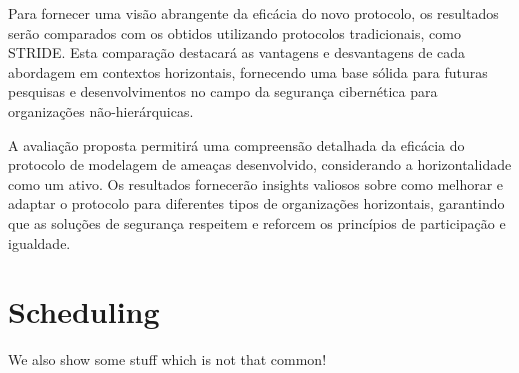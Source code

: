 Para fornecer uma visão abrangente da eficácia do novo protocolo, os
resultados serão comparados com os obtidos utilizando protocolos tradicionais, como
STRIDE. Esta comparação destacará as vantagens e desvantagens de cada abordagem em
contextos horizontais, fornecendo uma base sólida para futuras pesquisas e
desenvolvimentos no campo da segurança cibernética para organizações não-hierárquicas. 

A avaliação proposta permitirá uma compreensão detalhada da eficácia do
protocolo de modelagem de ameaças desenvolvido, considerando a horizontalidade como um
ativo. Os resultados fornecerão insights valiosos sobre como melhorar e adaptar o
protocolo para diferentes tipos de organizações horizontais, garantindo que as soluções
de segurança respeitem e reforcem os princípios de participação e igualdade. 

\section{Scheduling}
\label{sec:scheduling}

We also show some stuff which is not that common!